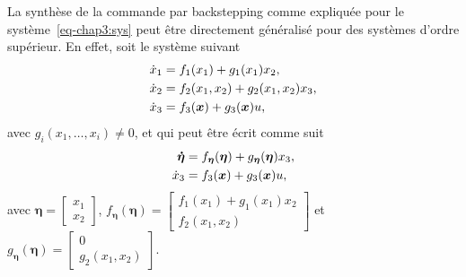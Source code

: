 La synthèse de la commande par backstepping comme expliquée pour le système~\eqref{eq-chap3:sys}  peut être directement généralisé pour des systèmes d'ordre supérieur. En effet,
soit le système suivant 
\begin{subequations}%
	\begin{align*}
			\dot{x}_1 &= f_1(x_1) + g_1(x_1)x_2,\\
			\dot{x}_2 &= f_2(x_1,x_2) + g_2(x_1,x_2)x_3,\\
			\dot{x}_3 &= f_3(\bm{x}) + g_3(\bm{x})u,
	\end{align*}
\end{subequations}
avec $g_i(x_1,\ldots,x_i)\neq0$, et	qui peut être écrit comme suit 
	\begin{subequations}\label{eq-chap3:sys 3rd order}
		\begin{align}
			\label{eq-chap3:subsys1_3rd}	\boldsymbol{\dot{\eta}} &= f_{\boldsymbol{{\eta}}}(\boldsymbol{\eta}) + g_{\boldsymbol{\eta}}(\boldsymbol{\eta})x_3,\\
			\label{eq-chap3:subsys2_3rd}	\dot{x}_3 &= f_3(\bm{x}) + g_3(\bm{x})u,
		\end{align}
\end{subequations}
avec $ \boldsymbol{\eta} = \begin{bmatrix}
	x_1 \\ x_2
\end{bmatrix}$, $f_{\boldsymbol{{\eta}}}(\boldsymbol{\eta}) = \begin{bmatrix}
f_1(x_1) + g_1(x_1)x_2 \\f_2(x_1,x_2)
\end{bmatrix}$ et $g_{\boldsymbol{{\eta}}}(\boldsymbol{\eta}) = \begin{bmatrix}
0 \\g_2(x_1,x_2)
\end{bmatrix}$.

